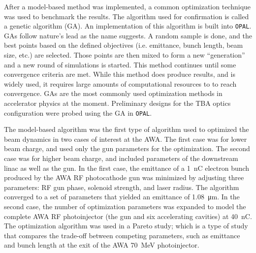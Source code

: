 After a model-based method was implemented, 
a common optimization technique was used to benchmark the results. 
The algorithm used for confirmation 
is called a genetic algorithm (GA). An implementation of this algorithm is
built into \verb|OPAL|. GAs follow nature's lead as the name suggests.
A random sample is done, and the best points based on the defined objectives
(i.e. emittance, bunch length, beam size, etc.)
are selected. Those points are then mixed to form a new ``generation''
and a new round of simulations is started. This method continues
until some convergence criteria are met. While this method does 
produce results, and is widely used, it requires large amounts 
of computational resources to to reach convergence.
GAs are the most commonly used optimization methods in accelerator physics
at the moment. Preliminary designs 
for the TBA optics configuration were probed using the GA in \verb|OPAL|. 



The model-based algorithm was the first type of algorithm used to optimized the beam dynamics 
in two cases of interest at the AWA.
The first case was for lower beam charge, and used only the gun parameters for the optimization.  
The second case was for higher beam charge, and included parameters of the downstream linac as well as the gun.
In the first case,  the emittance of a \SI{1}{nC} electron 
bunch produced by the AWA RF photocathode gun 
was minimized by adjusting three parameters: RF gun phase, 
solenoid strength, and laser radius. The algorithm 
converged to a set of parameters that yielded an
emittance of \SI{1.08}{\um}. In the second case, 
the number of optimization parameters was expanded to model the complete AWA RF 
photoinjector (the gun and six accelerating cavities) at \SI{40}{nC}. 
The optimization algorithm was used in a Pareto study; which is a type of study that compares the 
trade-off between competing parameters, such as emittance and bunch 
length at the exit of the AWA \SI{70}{MeV} photoinjector. 

